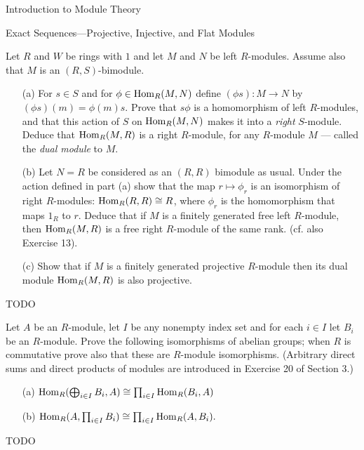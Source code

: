 \begin{chapter}{Introduction to Module Theory}
\begin{section}{Exact Sequences---Projective, Injective, and Flat Modules}
\begin{solution}
\end{solution}\oneperpage



\begin{problem}\label{ex:10.5.11}
Let $R$ and $W$ be rings with $1$ and let $M$ and $N$ be left $R$-modules. Assume also that $M$ is an $(R,S)$-bimodule.
\begin{enumerate}
\item[(a)] For $s\in S$ and for $\phi\in\operatorname{Hom}_R(M,N)$ define $(\phi s):M\to N$ by $(\phi s)(m) = \phi(m)s$. Prove that $s\phi$ is a homomorphism of left $R$-modules, and that this action of $S$ on $\operatorname{Hom}_R(M,N)$ makes it into a \emph{right} $S$-module. Deduce that $\operatorname{Hom}_R(M,R)$ is a right $R$-module, for any $R$-module $M$ --- called the \emph{dual module} to $M$.
\item[(b)] Let $N=R$ be considered as an $(R,R)$ bimodule as usual. Under the action defined in part (a) show that the map $r\mapsto \phi_r$ is an isomorphism of right $R$-modules: $\operatorname{Hom}_R(R,R)\cong R$, where $\phi_r$ is the homomorphism that maps $1_R$ to $r$. Deduce that if $M$ is a finitely generated free left $R$-module, then $\operatorname{Hom}_R(M,R)$ is a free right $R$-module of the same rank. (cf. also Exercise 13).
\item[(c)] Show that if $M$ is a finitely generated projective $R$-module then its dual module $\operatorname{Hom}_R(M,R)$ is also projective.
\end{enumerate}
\end{problem}
\begin{solution}TODO

\end{solution}\oneperpage



\begin{problem}\label{ex:10.5.12}
Let $A$ be an $R$-module, let $I$ be any nonempty index set and for each $i\in I$ let $B_i$ be an $R$-module. Prove the following isomorphisms of abelian groups; when $R$ is commutative prove also that these are $R$-module isomorphisms. (Arbitrary direct sums and direct products of modules are introduced in Exercise 20 of Section 3.)
\begin{enumerate}
\item[(a)] $\operatorname{Hom}_R(\bigoplus_{i\in I}B_i,A)\cong\prod_{i\in I}\operatorname{Hom}_R(B_i,A)$
\item[(b)] $\operatorname{Hom}_R(A,\prod_{i\in I}B_i)\cong\prod_{i\in I}\operatorname{Hom}_R(A,B_i).$
\end{enumerate}
\end{problem}
\begin{solution}TODO


\end{solution}
\end{section}
\end{chapter}
